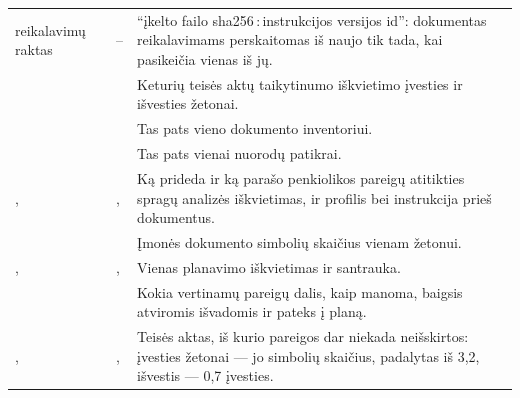 \begin{xltabular}{\textwidth}{@{}L{44mm}L{19mm}Y@{}}
reikalavimų raktas & -- & \enquote{įkelto failo sha256\,:\,instrukcijos versijos id}: dokumentas reikalavimams perskaitomas iš naujo tik tada, kai pasikeičia vienas iš jų. \\
 &  & Keturių teisės aktų taikytinumo iškvietimo įvesties ir išvesties žetonai. \\
 &  & Tas pats vieno dokumento inventoriui. \\
 &  & Tas pats vienai nuorodų patikrai. \\
,  & ,  & Ką prideda ir ką parašo penkiolikos pareigų atitikties spragų analizės iškvietimas, ir profilis bei instrukcija prieš dokumentus. \\
 &  & Įmonės dokumento simbolių skaičius vienam žetonui. \\
,  & ,  & Vienas planavimo iškvietimas ir santrauka. \\
 &  & Kokia vertinamų pareigų dalis, kaip manoma, baigsis atviromis išvadomis ir pateks į planą. \\
,  & ,  & Teisės aktas, iš kurio pareigos dar niekada neišskirtos: įvesties žetonai --- jo simbolių skaičius, padalytas iš 3,2, išvestis --- 0,7 įvesties. \\

\end{xltabular}
